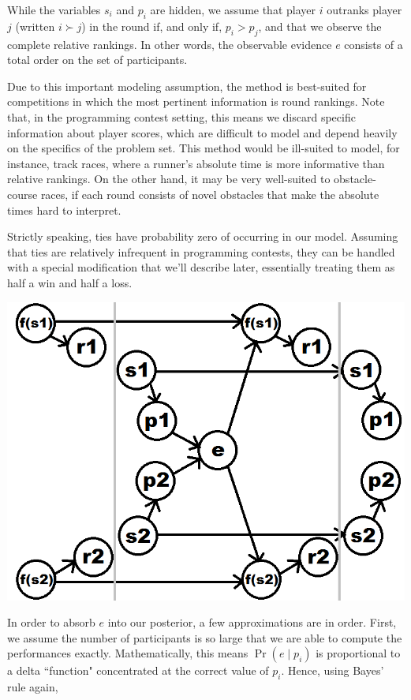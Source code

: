 While the variables $s_i$ and $p_i$ are hidden, we assume that player $i$ outranks player $j$ (written $i \succ j$) in the round if, and only if, $p_i > p_j$, and that we observe the complete relative rankings. In other words, the observable evidence $e$ consists of a total order on the set of participants.

Due to this important modeling assumption, the method is best-suited for competitions in which the most pertinent information is round rankings. Note that, in the programming contest setting, this means we discard specific information about player scores, which are difficult to model and depend heavily on the specifics of the problem set. This method would be ill-suited to model, for instance, track races, where a runner's absolute time is more informative than relative rankings. On the other hand, it may be very well-suited to obstacle-course races, if each round consists of novel obstacles that make the absolute times hard to interpret.

Strictly speaking, ties have probability zero of occurring in our model. Assuming that ties are relatively infrequent in programming contests, they can be handled with a special modification that we'll describe later, essentially treating them as half a win and half a loss.

\begin{center} \includegraphics[scale=0.35]{images/HMMlabeled.png} \end{center}

In order to absorb $e$ into our posterior, a few approximations are in order. First, we assume the number of participants is so large that we are able to compute the performances exactly. Mathematically, this means $\Pr(e \mid p_i)$ is proportional to a delta ``function" concentrated at the correct value of $p_i$. Hence, using Bayes' rule again,

